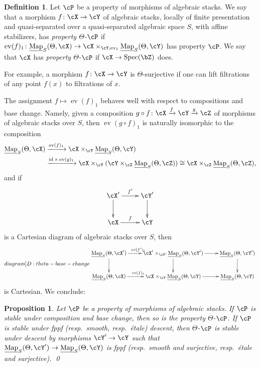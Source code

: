 \documentclass[a4paper]{amsart}
\numberwithin{equation}{section}
\theoremstyle{plain}
\newtheorem{prop}[thm]{Proposition}
\theoremstyle{definition}
\newtheorem{defn}[thm]{Definition}
\newcommand{\epf}{\qed \vspace{+10pt}}
\DeclareMathOperator{\Spec}{Spec}
\DeclareMathOperator{\ev}{ev}
\DeclareMathOperator{\id}{id}
\newcommand{\uMap}{\underline{{\rm Map}}}
\newcommand{\co}{\colon}
\begin{document}
\begin{defn}  \label{D:theta}
Let $\cP$ be a property of morphisms of algebraic stacks.  We say that a morphism $f \co \cX \to \cY$ of algebraic stacks, locally of finite presentation and quasi-separated over a quasi-separated algebraic space $S$, with affine stabilizers, 
has \emph{property $\Theta$-$\cP$} if $\ev(f)_1 \co \uMap_S(\Theta,\cX)  \to \cX \times_{\cY, \ev_1} \uMap_S(\Theta,\cY)$ has property $\cP$.   We say that $\cX$ 
 has \emph{property $\Theta$-$\cP$} if  $\cX \to \Spec(\bZ)$ does.
\end{defn}

For example, a morphism $f\co \cX \to \cY$ is $\Theta$-surjective if one can lift filtrations of any point $f(x)$ to filtrations of $x$.

The assignment $f \mapsto \ev(f)_1$ behaves well with respect to compositions and base change.  Namely, given a composition $g \circ f \co \cX \xrightarrow{f} \cY \xrightarrow{g} \cZ$ of morphisms of algebraic stacks over $S$, then $\ev(g \circ f)_1$ is naturally isomorphic to the composition
$$\begin{aligned}
\uMap_S(\Theta,\cX) &\xrightarrow{\ev(f)_1} \cX \times_{\cY} \uMap_S(\Theta,\cY) \\
&\xrightarrow{\id \times \ev(g)_1} \cX \times_{\cY} (\cY \times_{\cZ} \uMap_S(\Theta, \cZ)) \cong \cX \times_{\cZ} \uMap_S(\Theta, \cZ),
\end{aligned}$$
and if
$$\xymatrix{
\cX' \ar[r]^{f'} \ar[d]		& \cY' \ar[d] \\
\cX \ar[r]^f				& \cY
}$$
is a Cartesian diagram of algebraic stacks over $S$, then
\begin{equation}
\label[diagram]{D:theta-base-change}
\begin{split}
\xymatrix{
\uMap_S(\Theta,\cX') \ar[r]^{\ev(f')_1 \quad} \ar[d]	& \cX' \times_{\cY'} \uMap_S(\Theta,\cY') \ar[d]  \ar[r]& \uMap_S(\Theta,\cY') \ar[d]\\
\uMap_S(\Theta,\cX) \ar[r]^{\ev(f)_1 \quad}					& \cX \times_{\cY} \uMap_S(\Theta,\cY) \ar[r] & \uMap_S(\Theta,\cY)
}
\end{split}
\end{equation}
is Cartesian. We conclude:

\begin{prop} \label{P:composition-basechange}
Let $\cP$ be a property of morphisms of algebraic stacks. If $\cP$ is stable under composition and base change, then so is the property $\Theta$-$\cP$.  If $\cP$ is stable under fppf (resp.\ smooth, resp.\ \'etale) descent, then $\Theta$-$\cP$ is stable under descent by morphisms $\cY' \to \cY$ such that $\uMap_S(\Theta,\cY') \to \uMap_S(\Theta,\cY)$ is fppf (resp.\ smooth and surjective, resp.\ \'etale and surjective). \epf
\end{prop}
\end{document}
